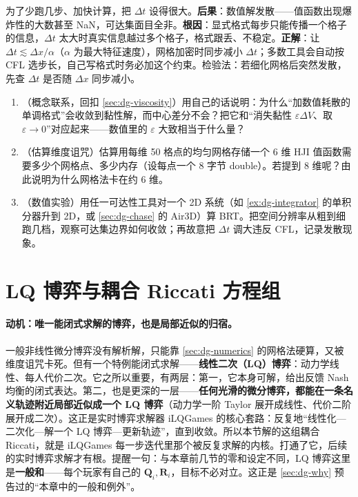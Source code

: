 \begin{pitfall}
为了少跑几步、加快计算，把 $\Delta t$ 设得很大。\textbf{后果}：数值解发散——值函数出现爆炸性的大数甚至 NaN，可达集面目全非。\textbf{根因}：显式格式每步只能传播一个格子的信息，$\Delta t$ 太大时真实信息越过多个格子，格式跟丢、不稳定。\textbf{正解}：让 $\Delta t\lesssim\Delta x/\alpha$（$\alpha$ 为最大特征速度），网格加密时同步减小 $\Delta t$；多数工具会自动按 CFL 选步长，自己写格式时务必加这个约束。检验法：若细化网格后突然发散，先查 $\Delta t$ 是否随 $\Delta x$ 同步减小。
\end{pitfall}

\begin{practice}
\begin{enumerate}
  \item （概念联系，回扣 \cref{sec:dg-viscosity}）用自己的话说明：为什么“加数值耗散的单调格式”会收敛到黏性解，而中心差分不会？把它和“消失黏性 $\varepsilon\Delta V$、取 $\varepsilon\to0$”对应起来——数值里的 $\varepsilon$ 大致相当于什么量？
  \item （估算维度诅咒）估算用每维 50 格点的均匀网格存储一个 6 维 HJI 值函数需要多少个网格点、多少内存（设每点一个 8 字节 double）。若提到 8 维呢？由此说明为什么网格法卡在约 6 维。
  \item （数值实验）用任一可达性工具对一个 2D 系统（如 \cref{ex:dg-integrator} 的单积分器升到 2D，或 \cref{sec:dg-chase} 的 Air3D）算 BRT。把空间分辨率从粗到细跑几档，观察可达集边界如何收敛；再故意把 $\Delta t$ 调大违反 CFL，记录发散现象。
\end{enumerate}
\end{practice}

\section{LQ 博弈与耦合 Riccati 方程组}
\label{sec:dg-lq}

\paragraph{动机：唯一能闭式求解的博弈，也是局部近似的归宿。}
一般非线性微分博弈没有解析解，只能靠 \cref{sec:dg-numerics} 的网格法硬算，又被维度诅咒卡死。但有一个特例能闭式求解——\textbf{线性二次（LQ）博弈}：动力学线性、每人代价二次。它之所以重要，有两层：第一，它本身可解，给出反馈 Nash 均衡的闭式表达。第二，也是更深的一层——\textbf{任何光滑的微分博弈，都能在一条名义轨迹附近局部近似成一个 LQ 博弈}（动力学一阶 Taylor 展开成线性、代价二阶展开成二次）。这正是实时博弈求解器 iLQGames 的核心套路：反复地“线性化—二次化—解一个 LQ 博弈—更新轨迹”，直到收敛。所以本节解的这组耦合 Riccati，就是 iLQGames 每一步迭代里那个被反复求解的内核。打通了它，后续的实时博弈求解才有根。提醒一句：与本章前几节的零和设定不同，LQ 博弈这里是\textbf{一般和}——每个玩家有自己的 $\mathbf Q_i,\mathbf R_i$，目标不必对立。这正是 \cref{sec:dg-why} 预告过的“本章中的一般和例外”。

